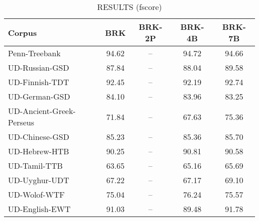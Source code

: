 \begin{table}[h]
    \centering
    \caption{RESULTS (fscore)}
    \label{tab:scores}
    
    \begin{tabular}{|l|c|c|c|c|}
        \hline
        \textbf{Corpus}                & \textbf{BRK} & \textbf{BRK-2P} & \textbf{BRK-4B} & \textbf{BRK-7B} \\ 
        \hline
        Penn-Treebank                  & 94.62        & --              & 94.72           & 94.66           \\
        UD-Russian-GSD                 & 87.84        & --              & 88.04           & 89.58           \\
        UD-Finnish-TDT                 & 92.45        & --              & 92.19           & 92.74           \\
        UD-German-GSD                  & 84.10        & --              & 83.96           & 83.25           \\
        UD-Ancient-Greek-Perseus       & 71.84        & --              & 67.63           & 75.36           \\
        UD-Chinese-GSD                 & 85.23        & --              & 85.36           & 85.70           \\
        UD-Hebrew-HTB                  & 90.25        & --              & 90.81           & 90.58           \\  
        UD-Tamil-TTB                   & 63.65        & --              & 65.16           & 65.69           \\
        UD-Uyghur-UDT                  & 67.22        & --              & 67.17           & 69.10           \\
        UD-Wolof-WTF                   & 75.04        & --              & 76.24           & 75.57           \\
        UD-English-EWT                 & 91.03        & --              & 89.48           & 91.78           \\
        \hline

    \end{tabular}
\end{table}


